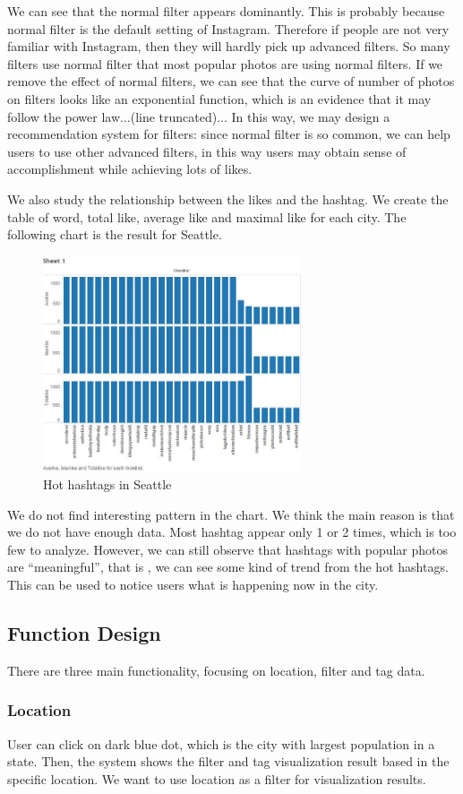 \documentclass[conference]{acmsiggraph}
\begin{document}
We can see that the normal filter appears dominantly. This is probably because normal filter is the default setting of Instagram. Therefore if people are not very familiar with Instagram, then they will hardly pick up advanced filters. So many filters use normal filter that most popular photos are using normal filters. If we remove the effect of normal filters, we can see that the curve of  number of photos on filters looks like an exponential function, which is an evidence that it may  follow the power law...(line truncated)...
In this way, we may design a recommendation system for filters:
since normal filter is so common,
we can help users to use other advanced filters,
in this way users may obtain sense of accomplishment while achieving lots of likes.


We also study the relationship between the likes and the hashtag. We create the table of word, total like, average like and maximal like for each city. The following chart is the result for Seattle.
\begin{figure}[ht]
  \centering
  \includegraphics[width=3in]{images/sample_Seattle_like_word}
  \caption{Hot hashtags in Seattle}
\end{figure}
We do not find interesting pattern in the chart. We think the main reason is that we do not have enough data. Most hashtag appear only 1 or 2 times, which is too few to analyze. However, we can still observe that hashtags with popular photos are “meaningful”, that is , we can see some kind of trend from the hot hashtags. This can be used to notice users what is happening now in the city.

\subsection{Function Design}
There are three main functionality, focusing on location, filter and tag data.

\subsubsection{Location}
User can click on dark blue dot, which is the city with largest population in a state. Then, the system shows the filter and tag visualization result based in the specific location. We want to use location as a filter for visualization results.
\end{document}
